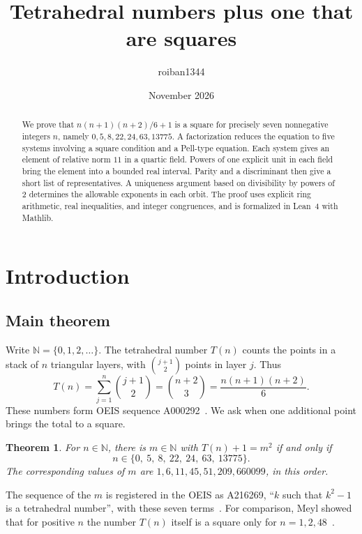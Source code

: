 \documentclass[a4paper,11pt]{article}
\title{Tetrahedral numbers plus one that are squares}
\author{roiban1344}
\date{November 2026}
\theoremstyle{plain}
\newtheorem{theorem}{Theorem}[section]
\theoremstyle{definition}
\theoremstyle{remark}
\numberwithin{equation}{section}
\numberwithin{table}{section}
\newcommand{\N}{\mathbb{N}}
\begin{document}
\maketitle

\begin{abstract}
We prove that $n(n+1)(n+2)/6+1$ is a square for precisely seven nonnegative integers $n$, namely $0,5,8,22,24,63,13775$.
A factorization reduces the equation to five systems involving a square condition and a Pell-type equation. Each system gives an element of relative norm $11$ in a quartic field.
Powers of one explicit unit in each field bring the element into a bounded real interval. Parity and a discriminant then give a short list of representatives.
A uniqueness argument based on divisibility by powers of $2$ determines the allowable exponents in each orbit.
The proof uses explicit ring arithmetic, real inequalities, and integer congruences, and is formalized in Lean~4 with Mathlib.
\end{abstract}

\tableofcontents

\section{Introduction}

\subsection{Main theorem}

Write $\N=\{0,1,2,\dots\}$. The tetrahedral number $T(n)$ counts the points in a stack of $n$ triangular layers, with $\binom{j+1}{2}$ points in layer $j$. Thus
\[
T(n)=\sum_{j=1}^n\binom{j+1}{2}=\binom{n+2}{3}=\frac{n(n+1)(n+2)}6.
\]
These numbers form OEIS sequence A000292~\cite{OEIS}. We ask when one additional point brings the total to a square.

\begin{theorem}\label{thm:main}
For $n\in\N$, there is $m\in\N$ with $T(n)+1=m^2$ if and only if
\[
n\in\{0,\ 5,\ 8,\ 22,\ 24,\ 63,\ 13775\}.
\]
The corresponding values of $m$ are $1,6,11,45,51,209,660099$, in this order.
\end{theorem}

The sequence of the $m$ is registered in the OEIS as A216269, ``$k$ such that $k^2-1$ is a tetrahedral number'', with these seven terms~\cite{OEIS}.
For comparison, Meyl showed that for positive $n$ the number $T(n)$ itself is a square only for $n=1,2,48$~\cite{Meyl1878}.
\end{document}
